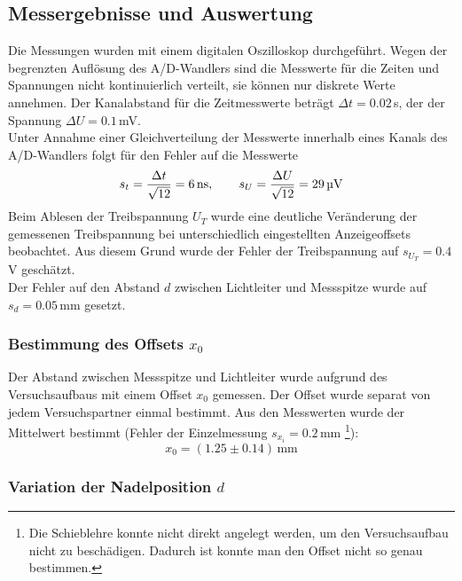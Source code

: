 \subsection{Messergebnisse und Auswertung}
Die Messungen wurden mit einem digitalen Oszilloskop durchgeführt.
Wegen der begrenzten Auflösung des A/D-Wandlers sind die Messwerte für
die Zeiten und Spannungen nicht kontinuierlich verteilt, sie können 
nur diskrete Werte annehmen. Der Kanalabstand für die Zeitmesswerte beträgt $\Delta t = 0.02$\,\textmu s,
der der Spannung $\Delta U = 0.1$\,mV. \\
Unter Annahme einer Gleichverteilung der Messwerte innerhalb eines Kanals des A/D-Wandlers folgt
für den Fehler auf die Messwerte
\begin{equation}
  s_t = \frac{\Delta t}{\sqrt{12}} = 6\,\text{ns}, \qquad s_U = \frac{\Delta U}{\sqrt{12}} = 29\,\text{\textmu V}
\end{equation}
Beim Ablesen der Treibspannung $U_T$ wurde eine deutliche Veränderung der gemessenen Treibspannung bei unterschiedlich eingestellten 
Anzeigeoffsets beobachtet. Aus diesem Grund wurde der Fehler der Treibspannung auf $s_{U_T} = 0.4$\,V geschätzt. \\
Der Fehler auf den Abstand $d$ zwischen Lichtleiter und Messspitze wurde auf $s_d = 0.05$\,mm gesetzt.
\subsubsection{Bestimmung des Offsets \texorpdfstring{$x_0$}{x0}}
Der Abstand zwischen Messspitze und Lichtleiter wurde aufgrund des Versuchsaufbaus mit einem Offset $x_0$ gemessen. Der Offset wurde separat 
von jedem Versuchspartner einmal bestimmt. Aus den Messwerten wurde der Mittelwert bestimmt (Fehler der Einzelmessung 
$s_{x_i} = 0.2$\,mm \footnote{Die Schieblehre konnte nicht direkt angelegt werden, um den Versuchsaufbau nicht zu beschädigen. 
Dadurch ist konnte man den Offset nicht so genau bestimmen.}):
\begin{equation}
  x_0 = (1.25 \pm 0.14)\,\text{mm}
\end{equation}
\subsubsection{Variation der Nadelposition \texorpdfstring{$d$}{d}}

